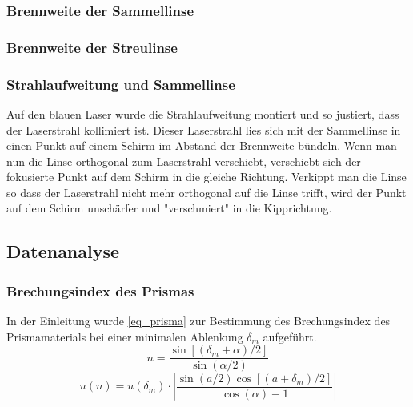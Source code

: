 \documentclass[
	a4paper,
	12pt,
	pagesize,
	ngerman
]{scrartcl}
\begin{document}
	\subsubsection{Brennweite der Sammellinse}
	
	\subsubsection{Brennweite der Streulinse}
	\subsubsection{Strahlaufweitung und Sammellinse}
	Auf den blauen Laser wurde die Strahlaufweitung montiert und so justiert, dass der Laserstrahl kollimiert ist. 
	Dieser Laserstrahl lies sich mit der Sammellinse in einen Punkt auf einem Schirm im Abstand der Brennweite bündeln.
	Wenn man nun die Linse orthogonal zum Laserstrahl verschiebt, verschiebt sich der fokusierte Punkt auf dem Schirm in die gleiche Richtung.
	Verkippt man die Linse so dass der Laserstrahl nicht mehr orthogonal auf die Linse trifft, wird der Punkt auf dem Schirm unschärfer und "verschmiert" in die Kipprichtung.

	\subsection{Datenanalyse}
	\subsubsection{Brechungsindex des Prismas}
	In der Einleitung wurde \cref{eq_prisma} zur Bestimmung des Brechungsindex des Prismamaterials bei einer minimalen Ablenkung $\delta_m$ aufgeführt.
	\begin{equation}
		n = \frac{\sin\left[(\delta_m+\alpha)/2\right]}{\sin\left(\alpha/2\right)}
		\label{eq_prisma}
	\end{equation}
	\begin{equation}
		u(n) = u(\delta_m) \cdot \left|\frac{\sin(a/2)\cos[(a+\delta_m)/2]}{\cos(\alpha)-1}\right| %
	\end{equation}
\end{document}
